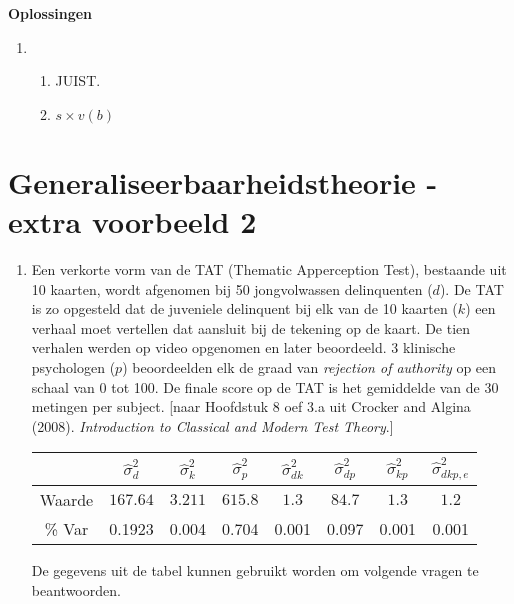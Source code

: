 \OPLOSSING
{
\textbf{Oplossingen}
\begin{enumerate}

\item
\begin{enumerate}
\item JUIST.
\item $s \times v(b)$

\end{enumerate}


\end{enumerate}
}


\OPGAVE
{
\section{Generaliseerbaarheidstheorie - extra voorbeeld 2}

\begin{enumerate}

\item
Een verkorte vorm van de TAT (Thematic Apperception Test), bestaande uit 10 kaarten, wordt afgenomen bij 50
jongvolwassen delinquenten ($d$).
De TAT is zo opgesteld dat de juveniele delinquent bij elk van de 10 kaarten ($k$) een verhaal moet vertellen dat aansluit bij de tekening op de kaart.
De tien verhalen werden op video opgenomen en later beoordeeld.
3 klinische psychologen ($p$) beoordeelden elk de graad van \emph{rejection of authority} op een schaal van 0 tot 100.
De finale score op de TAT is het gemiddelde van de 30 metingen per subject.
[naar Hoofdstuk 8 oef 3.a uit Crocker and Algina (2008). \emph{Introduction to Classical and Modern Test Theory}.]

\begin{center}
\renewcommand{\arraystretch}{1.2}
\begin{tabular}{|c|c|c|c|c|c|c|c|} \hline
 & $ \hat{\sigma}^2_{d} $ & $ \hat{\sigma}^2_{k} $& $ \hat{\sigma}^2_{p} $ & $ \hat{\sigma}^2_{dk} $ & $ \hat{\sigma}^2_{dp} $ & $ \hat{\sigma}^2_{kp} $ & $ \hat{\sigma}^2_{dkp,e} $ \\ \hline
Waarde  & $ 167.64 $ & $ 3.211 $ & $615.8 $ & $ 1.3 $ & $ 84.7 $ & $ 1.3 $ & $ 1.2 $ \\
\% Var & 0.1923& 0.004& 0.704& 0.001& 0.097& 0.001& 0.001 \\ \hline
\end{tabular}
\end{center}

\normalsize
De gegevens uit de tabel kunnen gebruikt worden om volgende vragen te beantwoorden.


\end{enumerate}}
